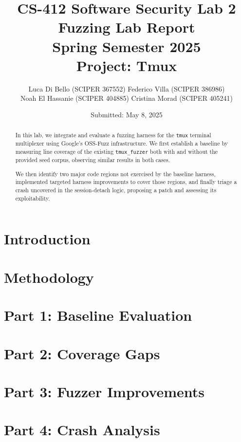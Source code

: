 \documentclass[11pt,a4paper,twocolumn]{article}
\title{%
  CS-412 Software Security Lab 2\\[0.5em]
  \Large Fuzzing Lab Report\\
  Spring Semester 2025\\[0.5em]
  Project: Tmux
}
\author{%
  Luca Di Bello (SCIPER 367552)
  Federico Villa (SCIPER 386986) \\
  Noah El Hassanie (SCIPER 404885)
  Cristina Morad (SCIPER 405241) \\
}
\date{Submitted: May 8, 2025}
\begin{document}
\maketitle

\begin{abstract}
	In this lab, we integrate and evaluate a fuzzing harness for the \texttt{tmux} terminal
	multiplexer using Google’s OSS-Fuzz infrastructure. We first establish a baseline
	by measuring line coverage of the existing \texttt{tmux\_fuzzer} both with and without the
	provided seed corpus, observing similar results in both cases.

	We then identify two major code regions not exercised by the baseline harness, implemented
	targeted harness improvements to cover those regions, and finally triage a crash uncovered
	in the session-detach logic, proposing a patch and assessing its exploitability.
\end{abstract}

\section*{Introduction}
\label{sec:introduction}



\section*{Methodology}
\label{sec:methodology}



\section*{Part 1: Baseline Evaluation}



\section*{Part 2: Coverage Gaps}



\section*{Part 3: Fuzzer Improvements}



\section*{Part 4: Crash Analysis}



\printbibliography
\end{document}
